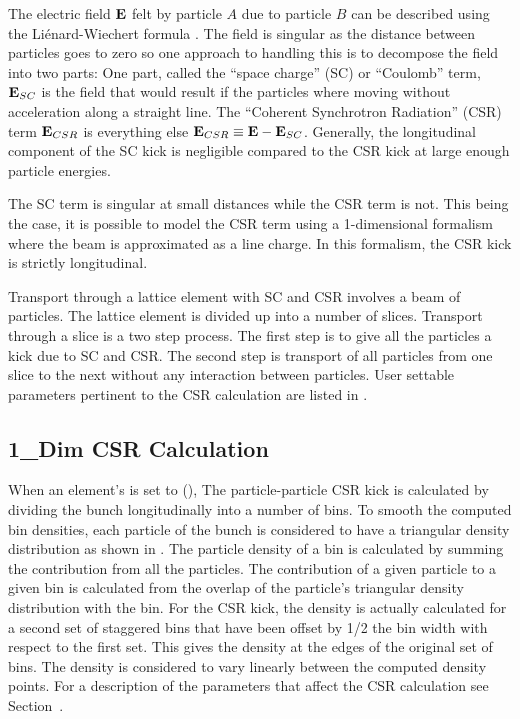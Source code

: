 The electric field ${\bf E}$ felt by particle $A$ due to particle $B$ can be described using the
Li\'{e}nard-Wiechert formula \cite{b:csr}. The field is singular as the distance between particles
goes to zero so one approach to handling this is to decompose the field into two parts: One part,
called the ``space charge'' (SC) or ``Coulomb'' term, ${\bf E}_{SC}$ is the field that would result if
the particles where moving without acceleration along a straight line. The ``Coherent Synchrotron
Radiation'' (CSR) term ${\bf E}_{CSR}$ is everything else ${\bf E}_{CSR} \equiv {\bf E} - {\bf E}_{SC}$.
Generally, the longitudinal component of the SC kick is negligible compared to the CSR kick at large
enough particle energies.

The SC term is singular at small distances while the CSR term is not. This being the case, it is
possible to model the CSR term using a 1-dimensional formalism where the beam is approximated as a
line charge\cite{b:csr,b:csr2}. In this formalism, the CSR kick is strictly longitudinal.

Transport through a lattice element with SC and CSR involves a beam of particles. The lattice
element is divided up into a number of slices. Transport through a slice is a two step process. The
first step is to give all the particles a kick due to SC and CSR. The second step is transport of
all particles from one slice to the next without any interaction between particles. User settable
parameters pertinent to the CSR calculation are listed in .

\subsection{1\_Dim CSR Calculation}
\label{s:csr.1d}

When an element's  is set to  (), The particle-particle
CSR kick is calculated by dividing the bunch longitudinally into a number of bins. To smooth the
computed bin densities, each particle of the bunch is considered to have a triangular density
distribution as shown in .  The particle density of a bin is calculated by summing
the contribution from all the particles. The contribution of a given particle to a given bin is
calculated from the overlap of the particle's triangular density distribution with the bin. For the
CSR kick, the density is actually calculated for a second set of staggered bins that have been
offset by 1/2 the bin width with respect to the first set. This gives the density at the edges of
the original set of bins. The density is considered to vary linearly between the computed density
points. For a description of the parameters that affect the CSR calculation see
Section~.

